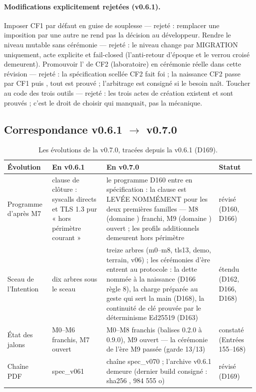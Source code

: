 \paragraph{Modifications explicitement rejetées (v0.6.1).} Imposer CF1 par défaut en
guise de souplesse — rejeté : remplacer une imposition par une autre ne rend pas la
décision au développeur. Rendre le niveau mutable sans cérémonie — rejeté : le niveau
change par MIGRATION uniquement, acte explicite et fail-closed (l'anti-retour d'époque
et le verrou croisé demeurent). Promouvoir l' de CF2 (laboratoire) en
cérémonie réelle dans cette révision — rejeté : la spécification scellée CF2 fait foi ;
la naissance CF2 passe par  CF1 puis , tout est prouvé ;
l'arbitrage est consigné si le besoin naît. Toucher au code des trois outils — rejeté :
les trois actes de création existent et sont prouvés ; c'est le droit de choisir qui
manquait, pas la mécanique.

\subsection{Correspondance v0.6.1 $\to$ v0.7.0}\label{sec:evolutions070}

\begin{table}[htbp]
\centering\small
\caption{Les évolutions de la v0.7.0, tracées depuis la v0.6.1 (D169).}
\label{tab:correspondance070}
\begin{tabularx}{\textwidth}{@{}l Y Y l@{}}
\toprule
\textbf{Évolution} & \textbf{En v0.6.1} & \textbf{En v0.7.0} & \textbf{Statut} \\
\midrule
Programme d'après M7 & clause de clôture : syscalls directs et TLS 1.3 pur « hors
périmètre courant » & le programme D160 entre en spécification : la clause est
LEVÉE NOMMÉMENT pour les deux premières familles — M8 (domaine )
franchi, M9 (domaine ) ouvert ; les profils additionnels demeurent
hors périmètre & révisé (D160, D166) \\
Sceau de l'Intention & dix arbres sous le sceau & treize arbres (m0--m8, tls13,
demo, terrain, v06) ; les cérémonies d'ère entrent au protocole : la dette nommée
à la naissance (D166 règle 8), la charge préparée au geste qui sert la main
(D168), la continuité de clé prouvée par le déterminisme Ed25519 (D163) & étendu
(D162, D166, D168) \\
État des jalons & M0--M6 franchis, M7 ouvert & M0--M8 franchis (balises 0.2.0 à
0.9.0), M9 ouvert — la cérémonie de l'ère M9 passée (garde 13/13) & constaté
(Entrées 155--168) \\
Chaîne PDF & spec\_v061 & chaîne spec\_v070 ; l'archive v0.6.1 demeure (dernier
build consigné : sha256 , 984 555 o) & révisé (D169) \\
\bottomrule
\end{tabularx}
\end{table}

